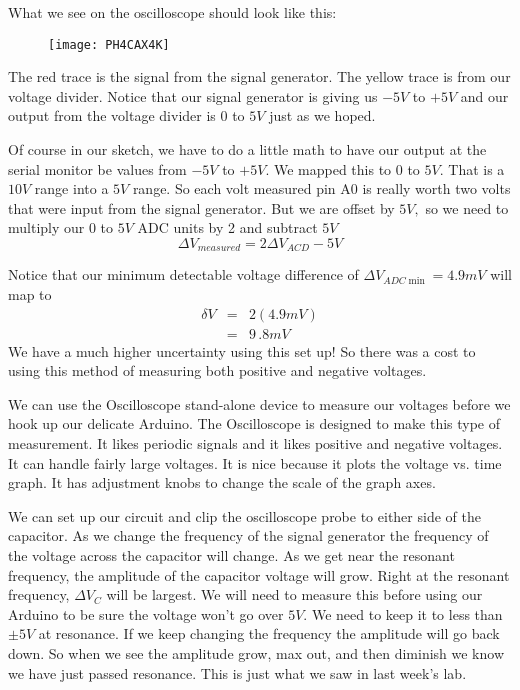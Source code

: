 What we see on the oscilloscope should look like this: 
\begin{figure}[h!]
	\centering
	\texttt{[image: PH4CAX4K]}
\end{figure}
The red trace is the signal from the signal generator. The yellow trace is from our voltage divider. Notice that our signal generator is giving us $-5\unit{V}$ to $+5\unit{V}$ and our output from the voltage divider is $0$ to $5\unit{V}$ just as we hoped.

Of course in our sketch, we have to do a little math to have our output at
the serial monitor be values from $-5\unit{V}$ to $+5\unit{V}.$ We mapped
this to $0$ to $5\unit{V}.$ That is a $10\unit{V}$ range into a $5\unit{V}$ range. So each volt measured pin A0 is really worth two volts that were input from the signal generator. But we are offset by $5\unit{V},$ so we need to multiply our $0$ to $5\unit{V}$ ADC units by 2 and subtract $5\unit{V}$
\begin{equation*}
	\Delta V_{measured}=2\Delta V_{ACD}-5\unit{V}
\end{equation*}



Notice that our minimum detectable voltage difference of $\Delta V_{ADC\min}=4.9\unit{mV}$ will map to 
\begin{eqnarray*}
	\delta V &=&2\left( 4.9\unit{mV}\right) \\
	         &=&9\,.8\unit{mV}
\end{eqnarray*}
We have a much higher uncertainty using this set up! So there was a cost to using this method of measuring both positive and negative voltages.

We can use the Oscilloscope stand-alone device to measure our voltages before we hook up our delicate Arduino. The Oscilloscope is designed to make this type of measurement. It likes periodic signals and it likes positive and negative voltages. It can handle fairly large voltages. It is nice because it plots the voltage vs. time graph. It has adjustment knobs to change the scale of the graph axes.

We can set up our circuit and clip the oscilloscope probe to either side of the capacitor. As we change the frequency of the signal generator the frequency of the voltage across the capacitor will change. As we get near the resonant frequency, the amplitude of the capacitor voltage will grow.
Right at the resonant frequency, $\Delta V_{C}$ will be largest. We will
need to measure this before using our Arduino to be sure the voltage won't
go over $5\unit{V}$. We need to keep it to less than $\pm 5\unit{V}$ at
resonance. If we keep changing the frequency the amplitude will go back
down. So when we see the amplitude grow, max out, and then diminish we know we have just passed resonance. This is just what we saw in last week's lab.

